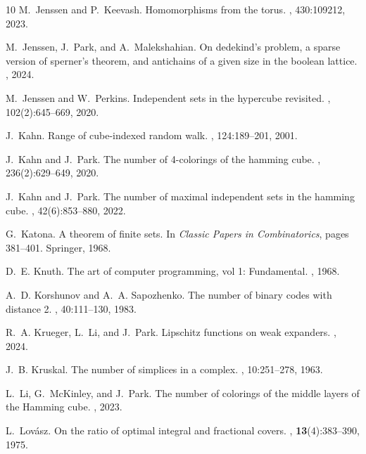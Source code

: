 \documentclass{amsart}
\theoremstyle{definition}
\newcommand{\0}[0]{\emptyset}
\begin{document}
\begin{thebibliography}{10}
M.~Jenssen and P.~Keevash.
\newblock Homomorphisms from the torus.
, 430:109212, 2023.

M.~Jenssen, J.~Park, and A.~Malekshahian.
\newblock On dedekind's problem, a sparse version of sperner's theorem, and antichains of a given size in the boolean lattice.
, 2024.

M.~Jenssen and W.~Perkins.
\newblock Independent sets in the hypercube revisited.
, 102(2):645--669, 2020.

J.~Kahn.
\newblock Range of cube-indexed random walk.
, 124:189--201, 2001.

J.~Kahn and J.~Park.
\newblock The number of 4-colorings of the hamming cube.
, 236(2):629--649, 2020.

J.~Kahn and J.~Park.
\newblock The number of maximal independent sets in the hamming cube.
, 42(6):853--880, 2022.

G.~Katona.
\newblock A theorem of finite sets.
\newblock In {\em Classic Papers in Combinatorics}, pages 381--401. Springer, 1968.

D.~E. Knuth.
\newblock The art of computer programming, vol 1: Fundamental.
, 1968.

A.~D. Korshunov and A.~A. Sapozhenko.
\newblock The number of binary codes with distance 2.
, 40:111--130, 1983.

R.~A. Krueger, L.~Li, and J.~Park.
\newblock Lipschitz functions on weak expanders.
, 2024.

J.~B. Kruskal.
\newblock The number of simplices in a complex.
, 10:251--278, 1963.

L.~Li, G.~McKinley, and J.~Park.
\newblock The number of colorings of the middle layers of the {H}amming cube.
, 2023.

L.~Lov\'asz.
\newblock On the ratio of optimal integral and fractional covers.
, \textbf{13}(4):383--390, 1975.


\end{thebibliography}
\end{document}
